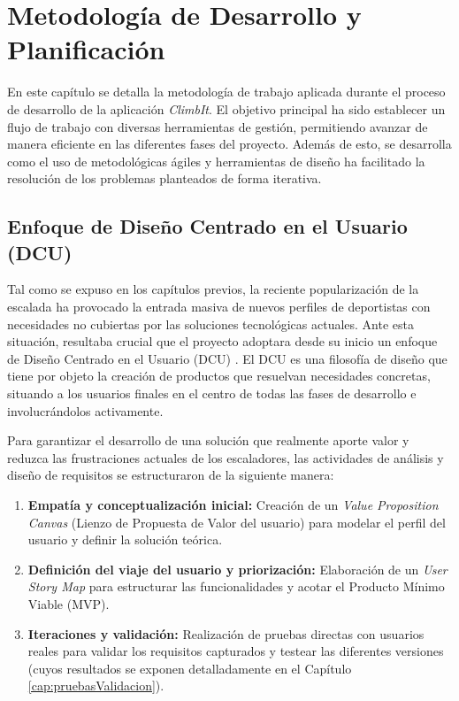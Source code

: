 \chapter{Metodología de Desarrollo y Planificación}
\label{cap:metodologiaDesarrollo}

En este capítulo se detalla la metodología de trabajo aplicada durante el proceso de desarrollo de la aplicación \textit{ClimbIt}. El objetivo principal ha sido establecer un flujo de trabajo con diversas herramientas de gestión, permitiendo avanzar de manera eficiente en las diferentes fases del proyecto. Además de esto, se desarrolla como el uso de metodológicas ágiles y herramientas de diseño ha facilitado la resolución de los problemas planteados de forma iterativa.

\section{Enfoque de Diseño Centrado en el Usuario (DCU)}

Tal como se expuso en los capítulos previos, la reciente popularización de la escalada ha provocado la entrada masiva de nuevos perfiles de deportistas con necesidades no cubiertas por las soluciones tecnológicas actuales. Ante esta situación, resultaba crucial que el proyecto adoptara desde su inicio un enfoque de Diseño Centrado en el Usuario (DCU) \citep{abras2004user}. El DCU es una filosofía de diseño que tiene por objeto la creación de productos que resuelvan necesidades concretas, situando a los usuarios finales en el centro de todas las fases de desarrollo e involucrándolos activamente.

Para garantizar el desarrollo de una solución que realmente aporte valor y reduzca las frustraciones actuales de los escaladores, las actividades de análisis y diseño  de requisitos se estructuraron de la siguiente manera:

\begin{enumerate}
\item \textbf{Empatía y conceptualización inicial:} Creación de un \textit{Value Proposition Canvas} (Lienzo de Propuesta de Valor del usuario) para modelar el perfil del usuario y definir la solución teórica.
\item \textbf{Definición del viaje del usuario y priorización:} Elaboración de un \textit{User Story Map} para estructurar las funcionalidades y acotar el Producto Mínimo Viable (MVP).
\item \textbf{Iteraciones y validación:} Realización de pruebas directas con usuarios reales para validar los requisitos capturados y testear las diferentes versiones 
(cuyos resultados se exponen detalladamente en el Capítulo \ref{cap:pruebasValidacion}).
\end{enumerate}

